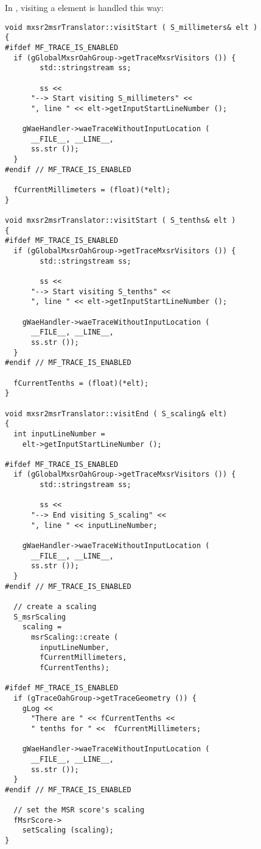 In , visiting a  element is handled this way:
\begin{lstlisting}[language=CPlusPlus,caption={Visiting {\tt $<$scaling /$>$}}]
void mxsr2msrTranslator::visitStart ( S_millimeters& elt )
{
#ifdef MF_TRACE_IS_ENABLED
  if (gGlobalMxsrOahGroup->getTraceMxsrVisitors ()) {
		std::stringstream ss;

		ss <<
      "--> Start visiting S_millimeters" <<
      ", line " << elt->getInputStartLineNumber ();

    gWaeHandler->waeTraceWithoutInputLocation (
      __FILE__, __LINE__,
      ss.str ());
  }
#endif // MF_TRACE_IS_ENABLED

  fCurrentMillimeters = (float)(*elt);
}

void mxsr2msrTranslator::visitStart ( S_tenths& elt )
{
#ifdef MF_TRACE_IS_ENABLED
  if (gGlobalMxsrOahGroup->getTraceMxsrVisitors ()) {
		std::stringstream ss;

		ss <<
      "--> Start visiting S_tenths" <<
      ", line " << elt->getInputStartLineNumber ();

    gWaeHandler->waeTraceWithoutInputLocation (
      __FILE__, __LINE__,
      ss.str ());
  }
#endif // MF_TRACE_IS_ENABLED

  fCurrentTenths = (float)(*elt);
}

void mxsr2msrTranslator::visitEnd ( S_scaling& elt)
{
  int inputLineNumber =
    elt->getInputStartLineNumber ();

#ifdef MF_TRACE_IS_ENABLED
  if (gGlobalMxsrOahGroup->getTraceMxsrVisitors ()) {
		std::stringstream ss;

		ss <<
      "--> End visiting S_scaling" <<
      ", line " << inputLineNumber;

    gWaeHandler->waeTraceWithoutInputLocation (
      __FILE__, __LINE__,
      ss.str ());
  }
#endif // MF_TRACE_IS_ENABLED

  // create a scaling
  S_msrScaling
    scaling =
      msrScaling::create (
        inputLineNumber,
        fCurrentMillimeters,
        fCurrentTenths);

#ifdef MF_TRACE_IS_ENABLED
  if (gTraceOahGroup->getTraceGeometry ()) {
    gLog <<
      "There are " << fCurrentTenths <<
      " tenths for " <<  fCurrentMillimeters;

    gWaeHandler->waeTraceWithoutInputLocation (
      __FILE__, __LINE__,
      ss.str ());
  }
#endif // MF_TRACE_IS_ENABLED

  // set the MSR score's scaling
  fMsrScore->
    setScaling (scaling);
}
\end{lstlisting}


